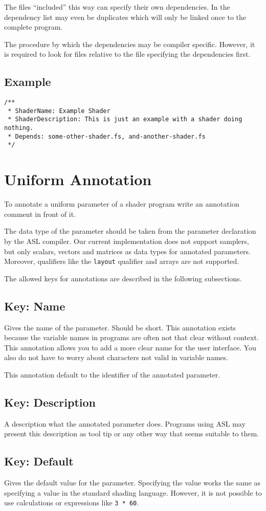 \documentclass[11pt,a4paper]{scrreprt}
\newcommand{\key}[1]{\subsection{Key: #1}}
\begin{document}
The files ``included'' this way can specify their own dependencies. In the 
dependency list may even be duplicates which will only be linked once to the 
complete program.

The procedure by which the dependencies may be compiler specific. However, it is
required to look for files relative to the file specifying the dependencies 
first.

\subsection{Example}
\begin{lstlisting}
/**
 * ShaderName: Example Shader
 * ShaderDescription: This is just an example with a shader doing nothing.
 * Depends: some-other-shader.fs, and-another-shader.fs
 */
\end{lstlisting}

\section{Uniform Annotation}
To annotate a uniform parameter of a shader program write an annotation comment 
in front of it.

The data type of the parameter should be taken from the parameter declaration by 
the ASL compiler. Our current implementation does not support samplers, but only 
scalars, vectors and matrices as data types for annotated parameters. Moreover, 
qualifiers like the \lstinline$layout$ qualifier and arrays are not supported.

The allowed keys for annotations are described in the following subsections.

\key{Name}
Gives the name of the parameter. Should be short. This annotation exists because 
the variable names in programs are often not that clear without context. This 
annotation allows you to add a more clear name for the user interface. You also 
do not have to worry about characters not valid in variable names.

This annotation default to the identifier of the annotated parameter.

\key{Description}
A description what the annotated parameter does. Programs using ASL may present 
this description as tool tip or any other way that seems suitable to them.

\key{Default}
Gives the default value for the parameter. Specifying the value works the same 
as specifying a value in the standard shading language. However, it is not 
possible to use calculations or expressions like \lstinline$3 * 60$.
\end{document}
